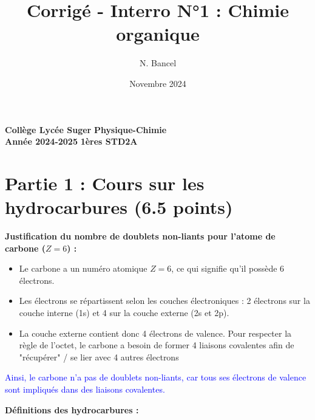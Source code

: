\documentclass{exam}
\title{Corrigé - Interro N°1 : Chimie organique}
\author{N. Bancel}
\date{Novembre 2024}
\begin{document}
\textbf{Collège Lycée Suger}
\hfill
\textbf{Physique-Chimie} \\

\textbf{Année 2024-2025}
\hfill
\textbf{1ères STD2A} \par

{\let\newpage\relax\maketitle}

\section*{Partie 1 : Cours sur les hydrocarbures (6.5 points)}

\begin{questions}
  \question[1] \textbf{Justification du nombre de doublets non-liants pour l'atome de carbone ($Z = 6$) :}
  
  \begin{itemize}[noitemsep]
    \item Le carbone a un numéro atomique \( Z = 6 \), ce qui signifie qu'il possède 6 électrons.
    \item Les électrons se répartissent selon les couches électroniques : 2 électrons sur la couche interne (1s) et 4 sur la couche externe (2s et 2p).
    \item La couche externe contient donc 4 électrons de valence. Pour respecter la règle de l'octet, le carbone a besoin de former 4 liaisons covalentes afin de "récupérer" / se lier avec 4 autres électrons
  \end{itemize}

  \textcolor{blue}{Ainsi, le carbone n'a pas de doublets non-liants, car tous ses électrons de valence sont impliqués dans des liaisons covalentes.}

  \question[1] \textbf{Définitions des hydrocarbures :}
\end{questions}
\end{document}

